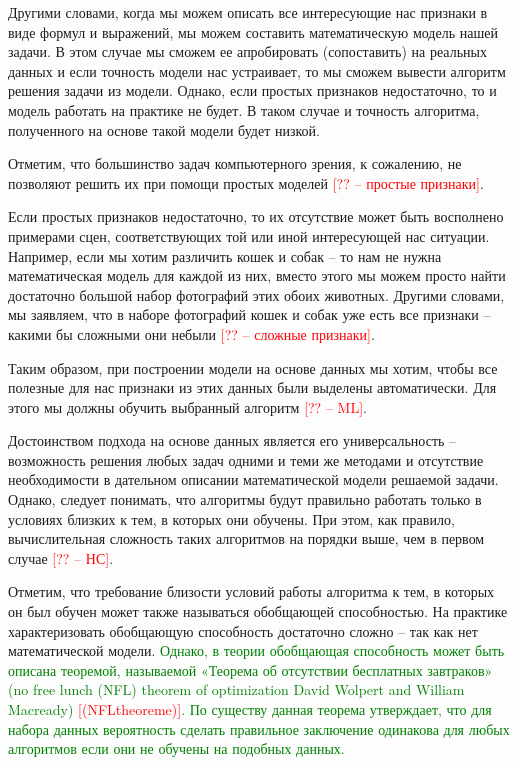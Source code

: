 \documentclass[12pt]{article}
\begin{document}
\begin{sloppypar}
Другими словами, когда мы можем описать все интересующие нас признаки в виде формул и выражений, мы можем составить математическую модель нашей задачи. В этом случае мы сможем ее апробировать (сопоставить) на реальных данных и если точность модели нас устраивает, то мы сможем вывести алгоритм решения задачи из модели. Однако, если простых признаков недостаточно, то и модель работать на практике не будет. В таком случае и точность алгоритма, полученного на основе такой модели будет низкой.

Отметим, что большинство задач компьютерного зрения, к сожалению, не позволяют решить их при помощи простых моделей \textcolor{red}{[?? – простые признаки]}.

Если простых признаков недостаточно, то их отсутствие может быть восполнено примерами сцен, соответствующих той или иной интересующей нас ситуации. Например, если мы хотим различить кошек и собак – то нам не нужна математическая модель для каждой из них, вместо этого мы можем просто найти достаточно большой набор фотографий этих обоих животных. Другими словами, мы заявляем, что в наборе фотографий кошек и собак уже есть все признаки – какими бы сложными они небыли \textcolor{red}{[?? – сложные признаки]}.

Таким образом, при построении модели на основе данных мы хотим, чтобы все полезные для нас признаки из этих данных были выделены автоматически. Для этого мы должны обучить выбранный алгоритм \textcolor{red}{[?? – ML]}.

Достоинством подхода на основе данных является его универсальность – возможность решения любых задач одними и теми же методами и отсутствие необходимости в дательном описании математической модели решаемой задачи. Однако, следует понимать, что алгоритмы будут правильно работать только в условиях близких к тем, в которых они обучены. При этом, как правило, вычислительная сложность таких алгоритмов на порядки выше, чем в первом случае \textcolor{red}{[?? – НС]}. 

Отметим, что требование близости условий работы алгоритма к тем, в которых он был обучен может также называться обобщающей способностью. На практике характеризовать обобщающую способность достаточно сложно – так как нет математической модели. \textcolor{green}{Однако, в теории обобщающая способность может быть описана теоремой, называемой «Теорема об отсутствии бесплатных завтраков» (no free lunch (NFL) theorem of optimization  David Wolpert and William Macready) \textcolor{red}{[(NFLtheoreme)]}. По существу данная теорема утверждает, что для набора данных вероятность сделать правильное заключение одинакова для любых алгоритмов если они не обучены на подобных данных.}


\end{sloppypar}
\end{document}
